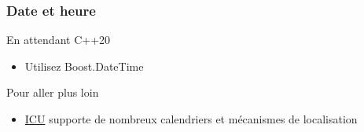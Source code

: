 \documentclass[C++.tex]{subfiles}
\begin{document}
\begin{frame}[fragile]
	\frametitle{Date et heure}
	\begin{block}{En attendant C++20}
		\begin{itemize}
			\item Utilisez Boost.DateTime
		\end{itemize}
	\end{block}

	\begin{block}{Pour aller plus loin}
		\begin{itemize}
			\item \href{http://site.icu-project.org/home}{ICU} supporte de nombreux calendriers et mécanismes de localisation
		\end{itemize}

	\end{block}
\end{frame}
\end{document}
